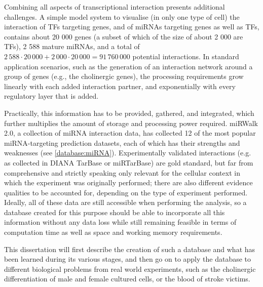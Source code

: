 Combining all aspects of transcriptional interaction presents additional challenges. A simple model system to visualise (in only one type of cell) the interaction of TFs targeting genes, and of miRNAs targeting genes as well as TFs, contains about 20 000 genes (a subset of which of the size of about 2 000 are TFs), 2 588 mature miRNAs, and a total of $ 2\,588 \cdot 20\,000 + 2\,000 \cdot 20\,000 = 91\,760\,000 $ potential interactions. In standard application scenarios, such as the generation of an interaction network around a group of genes (e.g., the cholinergic genes), the processing requirements grow linearly with each added interaction partner, and exponentially with every regulatory layer that is added. 

Practically, this information has to be provided, gathered, and integrated, which further multiplies the amount of storage and processing power required. miRWalk 2.0, a collection of miRNA interaction data, has collected 12 of the most popular miRNA-targeting prediction datasets, each of which has their strengths and weaknesses (see \ref{database:miRNA}). Experimentally validated interactions (e.g. as collected in DIANA TarBase or miRTarBase) are gold standard, but far from comprehensive and strictly speaking only relevant for the cellular context in which the experiment was originally performed; there are also different evidence qualities to be accounted for, depending on the type of experiment performed. Ideally, all of these data are still accessible when performing the analysis, so a database created for this purpose should be able to incorporate all this information without any data loss while still remaining feasible in terms of computation time as well as space and working memory requirements. 

This dissertation will first describe the creation of such a database and what has been learned during its various stages, and then go on to apply the database to different biological problems from real world experiments, such as the cholinergic differentiation of male and female cultured cells, or the blood of stroke victims.